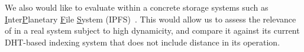 \noindent We also would like to evaluate \NAME within a concrete
storage systems such as \underline{I}nter\underline{P}lanetary
\underline{F}ile \underline{S}ystem
(IPFS)~\cite{henningsen2020mapping}. This would allow us to assess the
relevance of \NAME in a real system subject to high dynamicity, and
compare it against its current DHT-based indexing system that does not
include distance in its operation.



%





